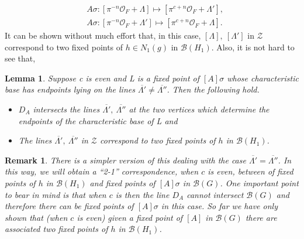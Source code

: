 \documentclass[12pt,letterpaper]{amsart}
\numberwithin{equation}{section}
\newtheorem{lemma}[theorem]{Lemma}
\newtheorem{remark}{Remark}
\theoremstyle{definition}
\theoremstyle{plain}
\providecommand{\cal}{\mathcal}
\def\zz{{\cal Z}}
\def\off{{\cal O}_F}
\def\bbg{{\cal B}(G)}
\def\bbH1{{\cal B}(H_1)}
\begin{document}
\begin{equation}
\label{eqn:4.12}
\begin{split}
&A\sigma : [\pi^{-n}\off +\Lambda] \longmapsto [\pi^{c+n}\off +\Lambda '],\\
&A\sigma : [\pi^{-n}\off +\Lambda '] \longmapsto [\pi^{c+n}\off +\Lambda].
\end{split}
\end{equation}
It can be shown without much effort that, in this case,  
$[\Lambda ],\ [\Lambda ']$ in $\zz$ correspond to two fixed points of
$h \in N_1(g)$ in $\bbH1$. Also, it is not hard to see that,

\begin{lemma}
\label{lemma:4.13}
Suppose c is even and L is a fixed point of
$[A]\sigma$ whose characteristic base has endpoints lying on the
lines $\overline{\Lambda '}\not= \overline{\Lambda ''}$. Then 
the following hold.

\begin{itemize}
\item[(a)] 
$D_A$ intersects the lines 
$\overline{\Lambda '},\ \overline{\Lambda ''}$
at the two vertices which determine the endpoints of the characteristic base 
of L and

\item[(b)] 
The lines $\overline{\Lambda '},\ \overline{\Lambda ''}$ in $\zz$
correspond to two fixed points of $h$ in $\bbH1$.
\end{itemize}
\end{lemma}

\begin{remark} 
There is a simpler version of this dealing with the case 
$\overline{\Lambda '}= \overline{\Lambda ''}$.
In this way, we will obtain a ``2-1'' correspondence, when
$c$ is even, between  of fixed points of $h$ in $\bbH1$ and
fixed points of $[A]\sigma$ in $\bbg$. One important point to bear in mind is 
that when $c$ is  then the line $D_A$ cannot intersect $\bbg$
and therefore there can be  fixed points of $[A]\sigma$ in this
case. So far we have only shown that (when $c$ is even) given a fixed point 
of $[A]$ in $\bbg$ there are associated two fixed points
of $h$ in $\bbH1$.
\end{remark}
 
\end{document}
